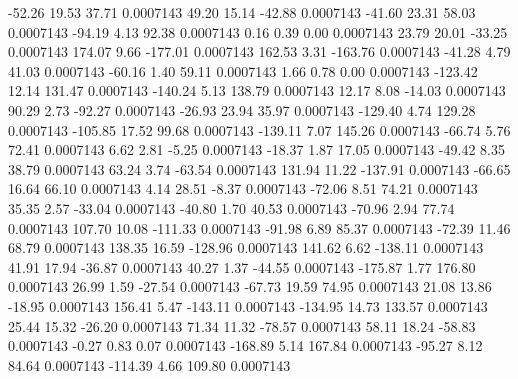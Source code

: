       -52.26       19.53       37.71     0.0007143
       49.20       15.14      -42.88     0.0007143
      -41.60       23.31       58.03     0.0007143
      -94.19        4.13       92.38     0.0007143
        0.16        0.39        0.00     0.0007143
       23.79       20.01      -33.25     0.0007143
      174.07        9.66     -177.01     0.0007143
      162.53        3.31     -163.76     0.0007143
      -41.28        4.79       41.03     0.0007143
      -60.16        1.40       59.11     0.0007143
        1.66        0.78        0.00     0.0007143
     -123.42       12.14      131.47     0.0007143
     -140.24        5.13      138.79     0.0007143
       12.17        8.08      -14.03     0.0007143
       90.29        2.73      -92.27     0.0007143
      -26.93       23.94       35.97     0.0007143
     -129.40        4.74      129.28     0.0007143
     -105.85       17.52       99.68     0.0007143
     -139.11        7.07      145.26     0.0007143
      -66.74        5.76       72.41     0.0007143
        6.62        2.81       -5.25     0.0007143
      -18.37        1.87       17.05     0.0007143
      -49.42        8.35       38.79     0.0007143
       63.24        3.74      -63.54     0.0007143
      131.94       11.22     -137.91     0.0007143
      -66.65       16.64       66.10     0.0007143
        4.14       28.51       -8.37     0.0007143
      -72.06        8.51       74.21     0.0007143
       35.35        2.57      -33.04     0.0007143
      -40.80        1.70       40.53     0.0007143
      -70.96        2.94       77.74     0.0007143
      107.70       10.08     -111.33     0.0007143
      -91.98        6.89       85.37     0.0007143
      -72.39       11.46       68.79     0.0007143
      138.35       16.59     -128.96     0.0007143
      141.62        6.62     -138.11     0.0007143
       41.91       17.94      -36.87     0.0007143
       40.27        1.37      -44.55     0.0007143
     -175.87        1.77      176.80     0.0007143
       26.99        1.59      -27.54     0.0007143
      -67.73       19.59       74.95     0.0007143
       21.08       13.86      -18.95     0.0007143
      156.41        5.47     -143.11     0.0007143
     -134.95       14.73      133.57     0.0007143
       25.44       15.32      -26.20     0.0007143
       71.34       11.32      -78.57     0.0007143
       58.11       18.24      -58.83     0.0007143
       -0.27        0.83        0.07     0.0007143
     -168.89        5.14      167.84     0.0007143
      -95.27        8.12       84.64     0.0007143
     -114.39        4.66      109.80     0.0007143
